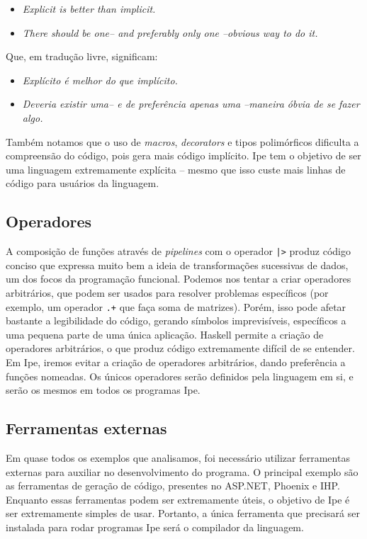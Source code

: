 \begin{itemize}
  \item \textit{Explicit is better than implicit.}
  \item \textit{There should be one-- and preferably only one --obvious way to do it.}
\end{itemize}

\cite{zenofpython}

Que, em tradução livre, significam:

\begin{itemize}
  \item \textit{Explícito é melhor do que implícito.}
  \item \textit{Deveria existir uma-- e de preferência apenas uma --maneira óbvia de se fazer algo.}
\end{itemize}

Também notamos que o uso de \textit{macros}, \textit{decorators} e tipos polimórficos
dificulta a compreensão do código, pois gera mais código implícito. Ipe tem o objetivo
de ser uma linguagem extremamente explícita -- mesmo que isso custe mais linhas
de código para usuários da linguagem.

\subsection{Operadores}

A composição de funções através de \textit{pipelines} com o operador
\texttt{|>} produz código conciso que expressa muito bem a ideia de transformações
sucessivas de dados, um dos focos da programação funcional. Podemos nos tentar
a criar operadores arbitrários, que podem ser usados para resolver problemas
específicos (por exemplo, um operador \texttt{.+} que faça soma de matrizes).
Porém, isso pode afetar bastante a legibilidade do código, gerando símbolos
imprevisíveis, específicos a uma pequena parte de uma única aplicação. Haskell
permite a criação de operadores arbitrários, o que produz código extremamente
difícil de se entender. Em Ipe, iremos evitar a criação de operadores arbitrários,
dando preferência a funções nomeadas. Os únicos operadores serão definidos pela
linguagem em si, e serão os mesmos em todos os programas Ipe.

\subsection{Ferramentas externas}

Em quase todos os exemplos que analisamos, foi necessário utilizar ferramentas
externas para auxiliar no desenvolvimento do programa. O principal exemplo são
as ferramentas de geração de código, presentes no ASP.NET, Phoenix e IHP. Enquanto
essas ferramentas podem ser extremamente úteis, o objetivo de Ipe é ser extremamente
simples de usar. Portanto, a única ferramenta que precisará ser instalada para
rodar programas Ipe será o compilador da linguagem.

